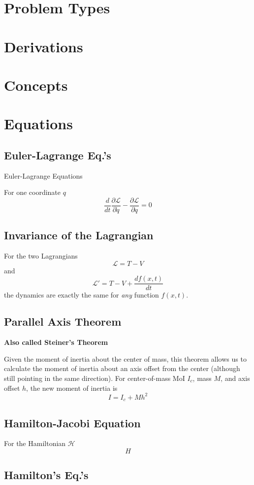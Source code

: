 \documentclass[25pt]{book}
\begin{document}
	
\tableofcontents

\chapter{Problem Types}

\chapter{Derivations}

\chapter{Concepts}

\chapter{Equations}

\section{Euler-Lagrange Eq.'s}

Euler-Lagrange Equations

For one coordinate $q$
\[
\frac{d}{dt} \frac{\partial \mathcal{L}}{\partial \dot{q}} - \frac{\partial \mathcal{L}}{\partial q}= 0
\]

\section{Invariance of the Lagrangian}

For the two Lagrangians 
\[
\mathcal{L} = T - V
\]
and 
\[
\mathcal{L}' = T - V + \frac{d f(x,t)}{dt}
\]
the dynamics are exactly the same for \textit{any} function $f(x,t)$. 

\section{Parallel Axis Theorem}
\textbf{Also called Steiner's Theorem}

Given the moment of inertia about the center of mass, this theorem allows us to calculate the moment of inertia about an axis offset from the center (although still pointing in the same direction). For center-of-mass MoI $I_c$, mass $M$, and axis offset $h$, the new moment of inertia is
\[
I = I_c + Mh^2
\]

\section{Hamilton-Jacobi Equation}

For the Hamiltonian $\mathcal{H}$
\[
H
\]

\section{Hamilton's Eq.'s}
\end{document}
